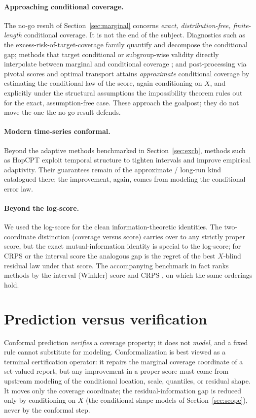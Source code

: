 \documentclass[11pt]{article}
\theoremstyle{definition}
\begin{document}
\paragraph{Approaching conditional coverage.}
The no-go result of Section~\ref{sec:marginal} concerns \emph{exact, distribution-free,
finite-length} conditional coverage. It is not the end of the subject. Diagnostics such as
the excess-risk-of-target-coverage family \citep{braun2025conditional} quantify and
decompose the conditional gap; methods that target conditional or subgroup-wise validity
directly interpolate between marginal and conditional coverage \citep{gibbs2025conditional};
and post-processing via pivotal scores and optimal transport
\citep{laplante2026pivotal} attains \emph{approximate} conditional coverage by estimating
the conditional law of the score, again conditioning on $X$, and explicitly under the
structural assumptions the impossibility theorem rules out for the exact, assumption-free
case. These approach the goalpost; they do not move the one the no-go result defends.

\paragraph{Modern time-series conformal.}
Beyond the adaptive methods benchmarked in Section~\ref{sec:exch}, methods such as HopCPT
\citep{auer2023hopcpt} exploit temporal structure to tighten intervals and improve
empirical adaptivity. Their guarantees remain of the approximate / long-run kind catalogued
there; the improvement, again, comes from modeling the conditional error law.

\paragraph{Beyond the log-score.}
We used the log-score for the clean information-theoretic identities. The two-coordinate
distinction (coverage versus score) carries over to any strictly proper score, but the exact
mutual-information identity is special to the log-score; for CRPS or the interval score the
analogous gap is the regret of the best $X$-blind residual law under that score. The
accompanying benchmark in fact ranks methods by the interval (Winkler) score and CRPS
\citep{gneiting2007strictly}, on which the same orderings hold.

\section{Prediction versus verification}\label{sec:verification}
Conformal prediction \emph{verifies} a coverage property; it does not \emph{model}, and a
fixed rule cannot substitute for modeling. Conformalization is best viewed as a terminal
certification operator: it repairs the marginal coverage coordinate of a set-valued report,
but any improvement in a proper score must come from upstream modeling of the conditional
location, scale, quantiles, or residual shape. It moves only the coverage coordinate; the
residual-information gap is reduced only by conditioning on $X$ (the conditional-shape models
of Section~\ref{sec:scope}), never by the conformal step.
\end{document}

